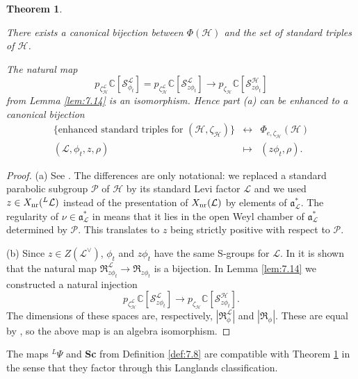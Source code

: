 \documentclass[11pt]{amsart}
\newtheorem{thm}{Theorem}[section]
\theoremstyle{definition}
\newcommand{\enuma}[1]{\begin{enumerate}[\textup{(}a\textup{)}] {#1} \end{enumerate}}
\newcommand{\mc}{\mathcal}
\newcommand{\mf}{\mathfrak}
\newcommand{\C}{\mathbb C}
\def\cS{{\mathcal S}}
\def\cL{{\mathcal L}}
\def\cH{{\mathcal H}}
\def\cR{{\mathfrak R}}
\def\nr{{\rm nr}}
\begin{document}
\begin{thm}\label{thm:8.2}
\enuma{
\item There exists a canonical bijection between $\Phi (\cH)$ and the set of
standard triples of $\cH$.
\item The natural map 
\[
p_{\zeta_\cH^\cL} \C[\cS^\cL_{\phi_t}] = p_{\zeta_\cH^\cL} \C[\cS^{\cL}_{z \phi_t}] 
\to p_{\zeta_\cH} \C[\cS^\cH_{z \phi_t}]
\]
from Lemma \ref{lem:7.14} is an isomorphism. Hence part (a) can be enhanced to a 
canonical bijection 
\[
\begin{array}{ccc}
\{\text{enhanced standard triples for } (\cH,\zeta_\cH) \} & \longleftrightarrow & 
\Phi_{e,\zeta_\cH} (\cH) \\
(\cL,\phi_t,z,\rho) & \mapsto & (z \phi_t,\rho) .
\end{array}
\]
} 
\end{thm}
\begin{proof}
(a) See \cite[Theorem 4.6]{SiZi}. The differences are only notational: we 
replaced a standard parabolic subgroup $\mc P$ of $\cH$ by its standard Levi factor 
$\cL$ and we used $z \in X_\nr ({}^L \cL)$ instead of the presentation of $X_\nr (\cL)$
by elements of $\mf a^*_\cL$. The regularity of $\nu \in \mf a^*_\cL$ in \cite{SiZi}
means that it lies in the open Weyl chamber of $\mf a^*_\cL$ determined by
$\mc P$. This translates to $z$ being strictly positive with respect to $\mc P$.

(b) Since $z \in Z(\cL^\vee)$, $\phi_t$ and $z \phi_t$ have the same S-groups for $\cL$.
In \cite[Proposition 7.1]{SiZi} it is shown that the natural map $\cR_{z \phi_t}^\cL \to 
\cR_{z \phi_t}$ is a bijection. In Lemma \ref{lem:7.14} we constructed a natural
injection
\[ 
p_{\zeta_\cH^\cL} \C[\cS^{\cL}_{z \phi_t}] \to p_{\zeta_\cH} \C[\cS^\cH_{z \phi_t}] .
\]
The dimensions of these spaces are, respectively, $|\cR_\phi^\cL|$ and $|\cR_\phi|$.
These are equal by \cite[Proposition 7.1]{SiZi}, so the above map is an algebra
isomorphism.
\end{proof}

The maps ${}^L \Psi$ and {\bf Sc} from Definition \ref{def:7.8} are compatible with
Theorem \ref{thm:8.2} in the sense that they factor through this Langlands
classification.
\end{document}
